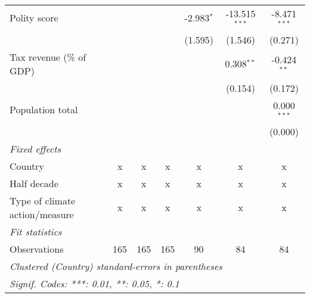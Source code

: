 \begin{tabular}{lcccccc}
   Polity score                                                     &               &               &               & -2.983$^{*}$ & -13.515$^{***}$ & -8.471$^{***}$\\   
                                                                    &               &               &               & (1.595)      & (1.546)         & (0.271)\\   
   Tax revenue (\% of GDP)                                          &               &               &               &              & 0.308$^{**}$    & -0.424$^{**}$\\   
                                                                    &               &               &               &              & (0.154)         & (0.172)\\   
   Population total                                                 &               &               &               &              &                 & 0.000$^{***}$\\   
                                                                    &               &               &               &              &                 & (0.000)\\   
   \emph{Fixed effects}\\
   Country                                                          & x             & x             & x             & x            & x               & x\\  
   Half decade                                                      & x             & x             & x             & x            & x               & x\\  
   Type of climate action/measure                                   & x             & x             & x             & x            & x               & x\\  
   \midrule \emph{Fit statistics}\\
   Observations                                                     & 165           & 165           & 165           & 90           & 84              & 84\\  
   \midrule
   \multicolumn{7}{l}{\emph{Clustered (Country) standard-errors in parentheses}}\\
   \multicolumn{7}{l}{\emph{Signif. Codes: ***: 0.01, **: 0.05, *: 0.1}}\\
\end{tabular}
\par\endgroup


